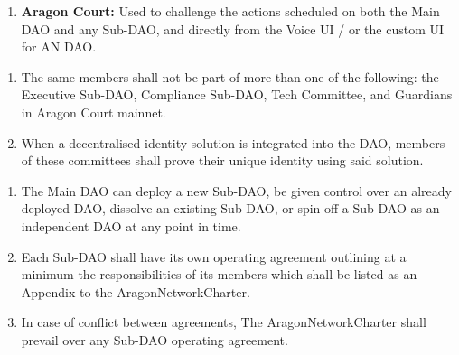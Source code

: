 \begin{enumerate}
\begin{enumerate}
\begin{enumerate}
		\end{enumerate}
		
		\item \textbf{Aragon Court:} Used to challenge the actions scheduled on both the Main \ac{DAO} and any Sub-\ac{DAO}, and directly from the Voice UI / or the custom UI for AN \ac{DAO}.
	\end{enumerate}
	
	\begin{enumerate}
		\item The same members shall not be part of more than one of the following: the Executive Sub-\ac{DAO}, Compliance Sub-\ac{DAO}, Tech Committee, and Guardians in Aragon Court mainnet.
		\item When a decentralised identity solution is integrated into the \ac{DAO}, members of these committees shall prove their unique identity using said solution.
	\end{enumerate}


	\begin{enumerate}
		\item The Main \ac{DAO} can deploy a new Sub-\ac{DAO}, be given control over an already deployed \ac{DAO}, dissolve an existing Sub-\ac{DAO}, or spin-off a Sub-\ac{DAO} as an independent \ac{DAO} at any point in time.
		\item Each Sub-\ac{DAO} shall have its own operating agreement outlining at a minimum the responsibilities of its members which shall be listed as an Appendix to the \gls{AragonNetworkCharter}.
		\item In case of conflict between agreements, The \gls{AragonNetworkCharter} shall prevail over any Sub-\ac{DAO} operating agreement.
	\end{enumerate}


\end{enumerate}
